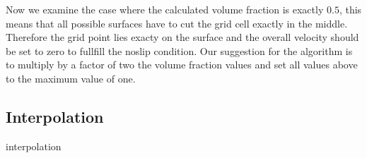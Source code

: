 Now we examine the case where the calculated volume fraction is exactly $0.5$, this means that all possible surfaces have to cut the grid cell exactly in the middle.
Therefore the grid point lies exacty on the surface and the overall velocity should be set to zero to fullfill the noslip condition.
Our suggestion for the algorithm  is to multiply by a factor of two the volume fraction values and set all values above to the maximum value of one.

\clearpage
\subsection{Interpolation}
interpolation
\clearpage

